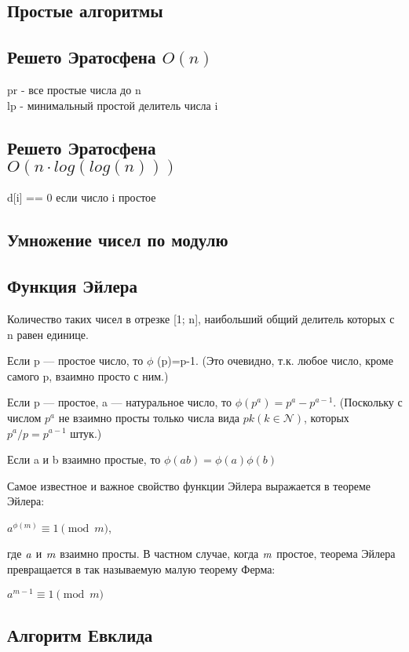 \documentclass[a4paper]{article}
\begin{document}
\begin{multicols*}{2}
		\section{Простые алгоритмы}		
		\subsection{Решето Эратосфена $O(n)$}
		pr - все простые числа до n \\
		lp - минимальный простой делитель числа i
		 
		

		\subsection{Решето Эратосфена \\ $O(n \cdot log(log(n)))$}
		d[i] == 0 если число i простое
		
		\subsection{Умножение чисел по модулю}
		
		\subsection{Функция Эйлера}
		Количество таких чисел в отрезке [1; n], наибольший общий делитель которых с n равен единице.
		
		Если p — простое число, то $\phi$ (p)=p-1.
		(Это очевидно, т.к. любое число, кроме самого p, взаимно просто с ним.)
		
		Если p — простое, a — натуральное число, то $\phi (p^a)=p^a-p^{a-1}$.
		(Поскольку с числом $p^a$ не взаимно просты только числа вида $pk (k \in \mathcal{N})$, которых $p^a / p = p^{a-1}$ штук.)
		
		Если a и b взаимно простые, то $\phi(ab) = \phi(a) \phi(b) $
		
		Самое известное и важное свойство функции Эйлера выражается в теореме Эйлера:
		
		$a^{\phi(m)} \equiv 1 \pmod m$, 
		
		где $\it a$ и $\it m$ взаимно просты.
		В частном случае, когда $\it m$ простое, теорема Эйлера превращается в так называемую малую теорему Ферма:
		
		$a^{m-1} \equiv 1  \pmod m $
		
		\subsection{Алгоритм Евклида}
		

\end{multicols*}
\end{document}
